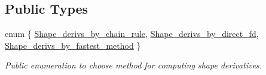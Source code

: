 \subsection*{Public Types}
\begin{DoxyCompactItemize}
\item 
enum \{ \hyperlink{classoomph_1_1ElementWithMovingNodes_a95a2aba98758542cd165867776c9ff4fa8dd2995a52d9a9aec22b622f5216569e}{Shape\+\_\+derivs\+\_\+by\+\_\+chain\+\_\+rule}, 
\hyperlink{classoomph_1_1ElementWithMovingNodes_a95a2aba98758542cd165867776c9ff4fadae48b807b4b6d1d5276e0eafd35a6e8}{Shape\+\_\+derivs\+\_\+by\+\_\+direct\+\_\+fd}, 
\hyperlink{classoomph_1_1ElementWithMovingNodes_a95a2aba98758542cd165867776c9ff4fab237a41e2e8fe3d86cb23ea50f377da5}{Shape\+\_\+derivs\+\_\+by\+\_\+fastest\+\_\+method}
 \}\begin{DoxyCompactList}\small\item\em Public enumeration to choose method for computing shape derivatives. \end{DoxyCompactList}
\end{DoxyCompactItemize}
